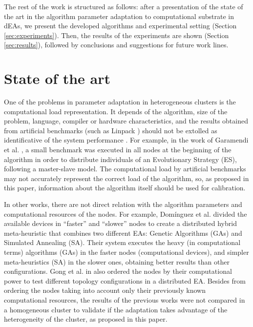 \documentclass[final,1p,times]{elsarticle}
\begin{document}
The rest of the work is structured as follows: after a presentation of
the state of
the art in the algorithm parameter adaptation to computational substrate in dEAs, 
 we present the developed algorithms and experimental setting (Section \ref{sec:experiments}). 
Then, the results of the experiments are shown (Section \ref{sec:results}), followed by conclusions and suggestions for future work lines.


%
\section{State of the art}
\label{sec:soa}

One of the problems in parameter adaptation in heterogeneous clusters is 
the computational load representation. It depends of the algorithm, size of the problem, 
language, compiler or hardware characteristics, and the results obtained from artificial 
benchmarks (such as  Linpack \cite{LinpackEndo10}) should not be extolled as identificative 
of the system performance \cite{LinpackDongarra03}. For example, in the work of Garamendi 
et al. \cite{PARALLELIMPLEMENTATION},  a small benchmark was executed in all nodes at the beginning
of the algorithm in order to distribute individuals of an Evolutionary Strategy
 (ES), following a master-slave model. The computational load by artificial benchmarks may not accurately 
 represent the correct load of the algorithm, so, as proposed in this paper, information 
 about the algorithm itself should be used for calibration.

In other works, there are not direct relation with the algorithm parameters and 
computational resources of the nodes. For example, Dom\'inguez et al. \cite{HYDROCM} 
divided the available devices in ``faster'' and ``slower'' nodes to create a distributed hybrid 
meta-heuristic that combines two different EAs: Genetic Algorithms (GAs) and Simulated
Annealing (SA). Their system executes the heavy (in computational
terms) algorithms (GAs) in the faster nodes (computational devices), and
simpler meta-heuristics (SA) in the slower ones, obtaining better results
than other configurations.  Gong et al. in \cite{HETEROGENEOUSTOPOLOGY} also ordered 
the nodes by their computational power to test different topology configurations in a distributed EA.
Besides from ordering the nodes taking into account 
only their previously known computational resources, the results of the previous works were not compared in a homogeneous 
cluster to validate if the adaptation takes advantage of the heterogeneity 
of the cluster, as proposed in this paper.
\end{document}
